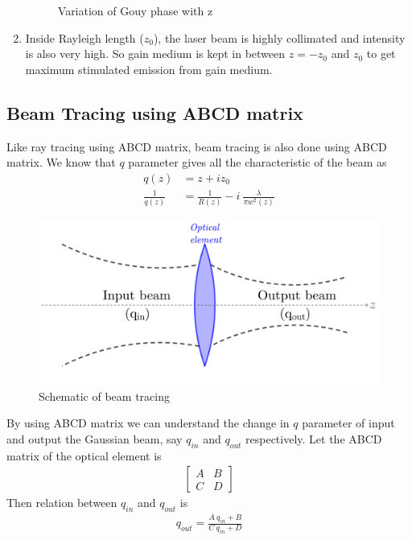 \documentclass[11pt,a4paper]{article}
\numberwithin{equation}{section}
\begin{document}
\begin{enumerate}
	\begin{figure}[H]
		\centering
		\scalebox{0.7}{}
		\caption{Variation of Gouy phase with z}
		\label{fig:gouy}
	\end{figure}
	
	\item 
	Inside Rayleigh length ($z_0$), the laser beam is highly collimated and intensity is also very high. So gain medium is kept in between $z=-z_0$ and $z_0$ to get maximum stimulated emission from gain medium.
\end{enumerate}


\subsection{Beam Tracing using ABCD matrix}
Like ray tracing using ABCD matrix, beam tracing is also done using ABCD matrix. We know that $q$ parameter gives all the characteristic of the beam as 
\begin{align*}
	q(z) &= z + iz_0\\
	\frac{1}{q(z)} &= \frac{1}{R(z)} - i\: \frac{\lambda}{\pi w^2(z)}
\end{align*}
\begin{figure}[H]
	\centering
	\includegraphics[width=0.5\linewidth]{"beam tracing"}
	\caption{Schematic of beam tracing}
	\label{fig:beam-tracing}
\end{figure}

By using ABCD matrix we can understand the change in $q$ parameter of input and output the Gaussian beam, say $q_{in}$ and $q_{out}$ respectively. Let the ABCD matrix of the optical element is 
\begin{align}
	\begin{bmatrix}
		A&B\\
		C&D
	\end{bmatrix}
\end{align}
Then relation between $q_{in}$ and $q_{out}$ is
\begin{align}
	q_{out}= \frac{A\:q_{in}+B}{C\:q_{in}+D}
\end{align}
\end{document}
